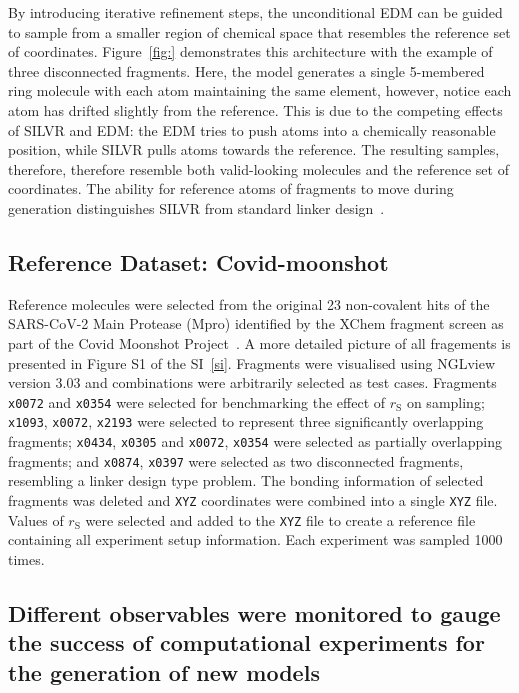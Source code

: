 \documentclass[journal=jacsat,manuscript=article]{achemso}
\begin{document}
By introducing iterative refinement steps, the unconditional EDM can be guided to sample from a smaller region of chemical space that resembles the reference set of coordinates. Figure~\ref{fig:} demonstrates this architecture with the example of three disconnected fragments. Here, the model generates a single 5-membered ring molecule with each atom maintaining the same element, however, notice each atom has drifted slightly from the reference. This is due to the competing effects of SILVR and EDM: the EDM tries to push atoms into a chemically reasonable position, while SILVR pulls atoms towards the reference. The resulting samples, therefore, therefore resemble both valid-looking molecules and the reference set of coordinates. The ability for reference atoms of fragments to move during generation distinguishes SILVR from standard linker design~\cite{linkerdesign1, hegeboom_linker}.

\subsection{Reference Dataset: Covid-moonshot}
Reference molecules were selected from the original 23 non-covalent hits of the SARS-CoV-2 Main Protease (Mpro) identified by the XChem fragment screen as part of the Covid Moonshot Project~\cite{consortium2023open, consortium2021open}. A more detailed picture of all fragements is presented in Figure S1 of the SI~\ref{si}. Fragments were visualised using NGLview version 3.03 and combinations were arbitrarily selected as test cases. Fragments \texttt{x0072} and \texttt{x0354} were selected for benchmarking the effect of $r_{\mathrm{S}}$ on sampling; \texttt{x1093}, \texttt{x0072}, \texttt{x2193} were selected to represent three significantly overlapping fragments; \texttt{x0434}, \texttt{x0305} and \texttt{x0072}, \texttt{x0354} were selected as partially overlapping fragments; and \texttt{x0874}, \texttt{x0397} were selected as two disconnected fragments, resembling a linker design type problem. The bonding information of selected fragments was deleted and \texttt{XYZ} coordinates were combined into a single \texttt{XYZ} file. Values of $r_{\mathrm{S}}$ were selected and added to the \texttt{XYZ} file to create a reference file containing all experiment setup information. Each experiment was sampled 1000 times. 

\subsection{Different observables were monitored to gauge the success of computational experiments for the generation of new models}
\end{document}

